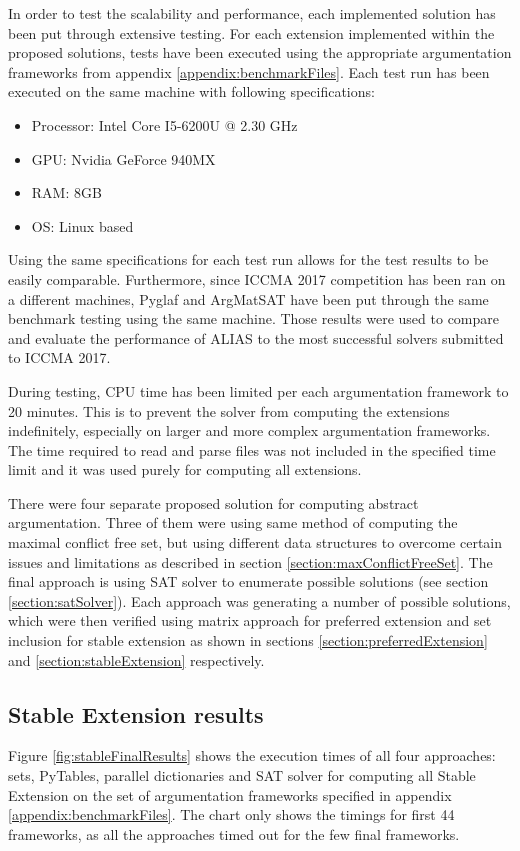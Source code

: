In order to test the scalability and performance, each implemented solution has been put through extensive testing. For each extension implemented within the proposed solutions, tests have been executed using the appropriate argumentation frameworks from appendix \ref{appendix:benchmarkFiles}. Each test run has been executed on the same machine with following specifications:

\begin{itemize}
	\item Processor: Intel Core I5-6200U @ 2.30 GHz
	\item GPU: Nvidia GeForce 940MX
	\item RAM: 8GB
	\item OS: Linux based
\end{itemize}

Using the same specifications for each test run allows for the test results to be easily comparable. Furthermore, since ICCMA 2017 competition has been ran on a different machines, Pyglaf \citep{pyglaf} and ArgMatSAT \citep{argmatSat} have been put through the same benchmark testing using the same machine. Those results were used to compare and evaluate the performance of ALIAS to the most successful solvers submitted to ICCMA 2017.

During testing, CPU time has been limited per each argumentation framework to 20 minutes. This is to prevent the solver from computing the extensions indefinitely, especially on larger and more complex argumentation frameworks. The time required to read and parse files was not included in the specified time limit and it was used purely for computing all extensions. 

There were four separate proposed solution for computing abstract argumentation. Three of them were using same method of computing the maximal conflict free set, but using different data structures to overcome certain issues and limitations as described in section \ref{section:maxConflictFreeSet}. The final approach is using SAT solver to enumerate possible solutions (see section \ref{section:satSolver}). Each approach was generating a number of possible solutions, which were then verified using matrix approach for preferred extension and set inclusion for stable extension as shown in sections \ref{section:preferredExtension} and \ref{section:stableExtension} respectively. 

\subsection{Stable Extension results} \label{section:stableExtensionResults}
Figure \ref{fig:stableFinalResults} shows the execution times of all four approaches: sets, PyTables, parallel dictionaries and SAT solver for computing all Stable Extension on the set of argumentation frameworks specified in appendix \ref{appendix:benchmarkFiles}. The chart only shows the timings for first 44 frameworks, as all the approaches timed out for the few final frameworks.

